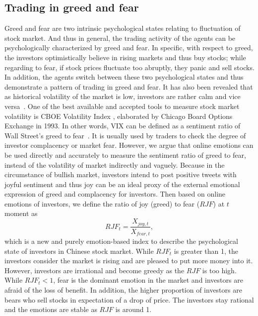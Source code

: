 \documentclass[aps,preprint,groupedaddress]{revtex4-1}
\begin{document}
\subsection{Trading in greed and fear}
Greed and fear are two intrinsic psychological states relating to fluctuation of stock market. And thus in general, the trading activity of the agents can be psychologically characterized by greed and fear. In specific, with respect to greed, the investors optimistically believe in rising markets and thus buy stocks; while regarding to fear, if stock prices fluctuate too abruptly, they panic and sell stocks. In addition, the agents switch between these two psychological states and thus demonstrate a pattern of trading in greed and fear. It has also been revealed that as historical volatility of the market is low, investors are rather calm and vice versa~\cite{Westerhoff2004Greed}. One of the best available and accepted tools to measure stock market volatility is CBOE Volatility Index {\color{black}{(VIX)}}, elaborated by Chicago Board Options Exchange in 1993. In other words, VIX can be defined as a sentiment ratio of Wall Street's greed to fear~\cite{nossman2009vix}. It is usually used by traders to check the degree of investor complacency or market fear. However, we argue that online emotions can be used directly and accurately to measure the sentiment ratio of greed to fear, instead of the volatility of market indirectly and vaguely. Because in the circumstance of bullish market, investors intend to post positive tweets with joyful sentiment and thus joy can be an ideal proxy of the external emotional expression of greed and complacency for investors. Then based on online emotions of investors, we define the ratio of joy (greed) to fear ($RJF$) at $t$ moment as 
\begin{equation}
 RJF_{t} = \frac{X_{joy,t}}{X_{fear,t}},
\end{equation}
which is a new and purely emotion-based index to describe the psychological state of investors in Chinese stock market. While $RJF_{t}$ is greater than 1, the investors consider the market is rising and are pleased to put more money into it. However, investors are irrational and become greedy as the $RJF$ is too high. While $RJF_{t} < 1$, fear is the dominant emotion in the market and investors are afraid of the loss of benefit. In addition, the higher proportion of investors are bears who sell stocks in expectation of a drop of price. The investors stay rational and the emotions are stable as $RJF$ is around 1.
\end{document}
